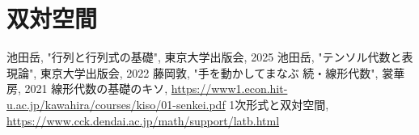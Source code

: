 \documentclass[../../topic_linear-algebra]{subfiles}
\begin{document}
\chapter{双対空間}










\sectionline
\begin{thebibliography}{9}
   池田岳, "行列と行列式の基礎", 東京大学出版会, 2025
   池田岳, "テンソル代数と表現論", 東京大学出版会, 2022
   藤岡敦, "手を動かしてまなぶ 続・線形代数", 裳華房, 2021
   線形代数の基礎のキソ, \url{https://www1.econ.hit-u.ac.jp/kawahira/courses/kiso/01-senkei.pdf}
   1次形式と双対空間, \url{https://www.cck.dendai.ac.jp/math/support/latb.html}
\end{thebibliography}
\end{document}
